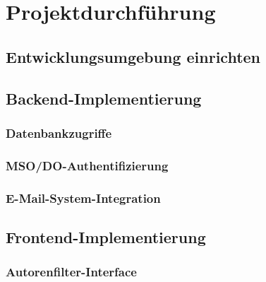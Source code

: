 \documentclass[11pt,a4paper]{article}
\begin{document}
\newpage
\section{Projektdurchführung}

\subsection{Entwicklungsumgebung einrichten}

\subsection{Backend-Implementierung}

\subsubsection{Datenbankzugriffe}

\subsubsection{MSO/DO-Authentifizierung}

\subsubsection{E-Mail-System-Integration}

\subsection{Frontend-Implementierung}

\subsubsection{Autorenfilter-Interface}
\end{document}
